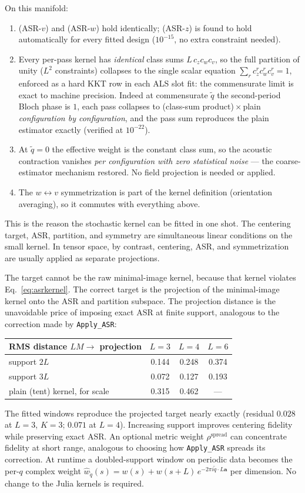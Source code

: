 \documentclass[11pt,a4paper]{article}
\begin{document}
On this manifold:
\begin{enumerate}
\item (ASR-$v$) and (ASR-$w$) hold identically; (ASR-$z$) is found to
hold automatically for every fitted design ($10^{-15}$, no extra
constraint needed).
\item Every per-pass kernel has \emph{identical} class sums
$L\, c_z c_w c_v$, so the full partition of unity ($L^2$ constraints)
collapses to the single scalar equation $\sum_r c^r_z c^r_w c^r_v = 1$,
enforced as a hard KKT row in each ALS slot fit: the commensurate limit
is exact to machine precision. Indeed at commensurate $\tilde q$ the
second-period Bloch phase is $1$, each pass collapses to (class-sum
product)\,$\times$\,plain \emph{configuration by configuration}, and the
pass sum reproduces the plain estimator exactly (verified at
$10^{-22}$).
\item At $\tilde q = 0$ the effective weight is the constant class sum,
so the acoustic contraction vanishes \emph{per configuration with zero
statistical noise} --- the coarse-estimator mechanism restored. No field
projection is needed or applied.
\item The $w\!\leftrightarrow\!v$ symmetrization is part of the kernel
definition (orientation averaging), so it commutes with everything above.
\end{enumerate}
This is the reason the stochastic kernel can be fitted in one shot.  The
centering target, ASR, partition, and symmetry are simultaneous linear
conditions on the small kernel.  In tensor space, by contrast, centering,
ASR, and symmetrization are usually applied as separate projections.

The target cannot be the raw minimal-image kernel, because that kernel
violates Eq.~\eqref{eq:asrkernel}.  The correct target is the projection of
the minimal-image kernel onto the ASR and partition subspace.  The
projection distance is the unavoidable price of imposing exact ASR at
finite support, analogous to the correction made by \texttt{Apply\_ASR}:
\begin{center}
\begin{tabular}{lccc}
\hline
RMS distance $L M \to$ projection & $L=3$ & $L=4$ & $L=6$ \\
\hline
support $2L$ & 0.144 & 0.248 & 0.374 \\
support $3L$ & 0.072 & 0.127 & 0.193 \\
plain (tent) kernel, for scale & 0.315 & 0.462 & --- \\
\hline
\end{tabular}
\end{center}
The fitted windows reproduce the projected target nearly exactly
(residual $0.028$ at $L=3$, $K=3$; $0.071$ at $L=4$).  Increasing support
improves centering fidelity while preserving exact ASR.  An optional metric
weight $\rho^{\mathrm{spread}}$ can concentrate fidelity at short range,
analogous to choosing how \texttt{Apply\_ASR} spreads its correction.  At
runtime a doubled-support window on periodic data becomes the per-$q$
complex weight
$\hat w_{\tilde q}(s) = w(s) + w(s{+}L)\, e^{-2\pi i \tilde q \cdot L
\mathbf{a}}$ per dimension.  No change to the Julia kernels is required.
\end{document}
